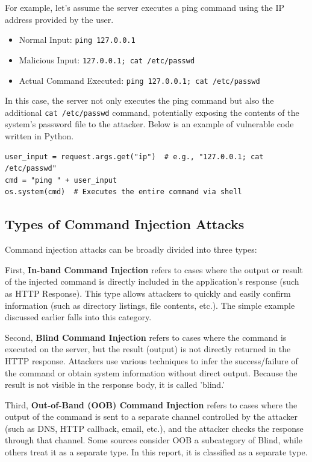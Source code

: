 \documentclass{article}
\begin{document}
For example, let's assume the server executes a ping command using the IP address provided by the user.

\begin{itemize}
  \item Normal Input: \texttt{ping 127.0.0.1}
  \item Malicious Input: \texttt{127.0.0.1; cat /etc/passwd}
  \item Actual Command Executed: \texttt{ping 127.0.0.1; cat /etc/passwd}
\end{itemize}

In this case, the server not only executes the ping command but also the additional \texttt{cat /etc/passwd} command, potentially exposing the contents of the system's password file to the attacker.
Below is an example of vulnerable code written in Python.

\begin{lstlisting}[caption={Vulnerable Code Example — Directly Combining User Input into Ping Command}]
user_input = request.args.get("ip")  # e.g., "127.0.0.1; cat /etc/passwd"
cmd = "ping " + user_input
os.system(cmd)  # Executes the entire command via shell
\end{lstlisting}

\subsection*{Types of Command Injection Attacks}
Command injection attacks can be broadly divided into three types:

First, \textbf{In-band Command Injection} refers to cases where the output or result of the injected command is directly included in the application's response (such as HTTP Response).
This type allows attackers to quickly and easily confirm information (such as directory listings, file contents, etc.). The simple example discussed earlier falls into this category.

Second, \textbf{Blind Command Injection} refers to cases where the command is executed on the server, but the result (output) is not directly returned in the HTTP response.
Attackers use various techniques to infer the success/failure of the command or obtain system information without direct output.
Because the result is not visible in the response body, it is called 'blind.'

Third, \textbf{Out-of-Band (OOB) Command Injection} refers to cases where the output of the command is sent to a separate channel controlled by the attacker (such as DNS, HTTP callback, email, etc.), and the attacker checks the response through that channel.
Some sources consider OOB a subcategory of Blind, while others treat it as a separate type. In this report, it is classified as a separate type.
\end{document}

